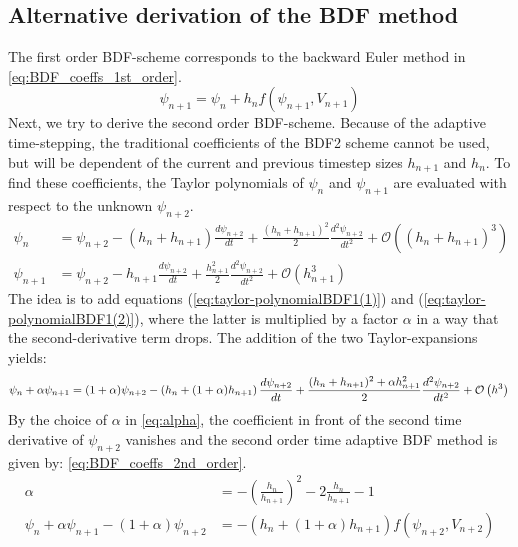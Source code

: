 \documentclass{report}
\begin{document}
\begin{appendices}
	\chapter{Alternative derivation of the BDF method}
	\label{apx:BDF_derivation_Taylor}
	The first order BDF-scheme corresponds to the backward Euler method in \autoref{eq:BDF_coeffs_1st_order}.
	\begin{equation}
	\label{eq:BDF_coeffs_1st_order}
	\psi_{n+1} = \psi_n + h_{n}f(\psi_{n+1},V_{n+1})
	\end{equation}
	Next, we try to derive the second order BDF-scheme. Because of the adaptive time-stepping, the traditional coefficients of the BDF2 scheme cannot be used, but will be dependent of the current and previous timestep sizes $h_{n+1}$ and $h_n$. To find these coefficients, the Taylor polynomials of $\psi_n$ and $\psi_{n+1}$ are evaluated with respect to the unknown $\psi_{n+2}$. 
	\begin{align}
	\label{eq:taylor-polynomialBDF1(1)}
	\psi_{n} &= \psi_{n+2} - (h_{n} + h_{n+1})\frac{d\psi_{n+2}}{dt} + \frac{(h_{n} + h_{n+1})^2}{2}\frac{d^2\psi_{n+2}}{dt^2} + \mathcal{O}\left((h_{n} + h_{n+1})^3\right) \\
	\label{eq:taylor-polynomialBDF1(2)}
	\psi_{n+1} &= \psi_{n+2} - h_{n+1}\frac{d\psi_{n+2}}{dt} + \frac{h_{n+1}^2}{2}\frac{d^2\psi_{n+2}}{dt^2} + \mathcal{O}\left(h_{n+1}^3\right)
	\end{align}
	The idea is to add equations (\ref{eq:taylor-polynomialBDF1(1)}) and (\ref{eq:taylor-polynomialBDF1(2)}), where the latter is multiplied by a factor $\alpha$ in a way that the second-derivative term drops. The addition of the two Taylor-expansions yields: 
	\begin{equation}
	\psi_{n} + \alpha \psi_{n+1} = (1+\alpha)\psi_{n+2} - \left(h_{n} + (1+\alpha)h_{n+1}\right)\frac{d\psi_{n+2}}{dt} + \frac{(h_{n} + h_{n+1})^2+\alpha h_{n+1}^2}{2}\frac{d^2\psi_{n+2}}{dt^2} + \mathcal{O}\left(h^3\right) \\
	\end{equation}
	By the choice of $\alpha$ in \autoref{eq:alpha}, the coefficient in front of the second time derivative of $\psi_{n+2}$ vanishes and the second order time adaptive BDF method is given by: \autoref{eq:BDF_coeffs_2nd_order}. 
	\begin{align}
	\label{eq:alpha}
	\alpha &= -\left(\frac{h_n}{h_{n+1}}\right)^2 - 2\frac{h_n}{h_{n+1}} - 1 \\
	\label{eq:BDF_coeffs_2nd_order}
	\psi_n + \alpha \psi_{n+1} -(1+\alpha)\psi_{n+2} &= -\left(h_n + (1+\alpha)h_{n+1}\right)f(\psi_{n+2}, V_{n+2})

\end{align}
\end{appendices}
\end{document}

